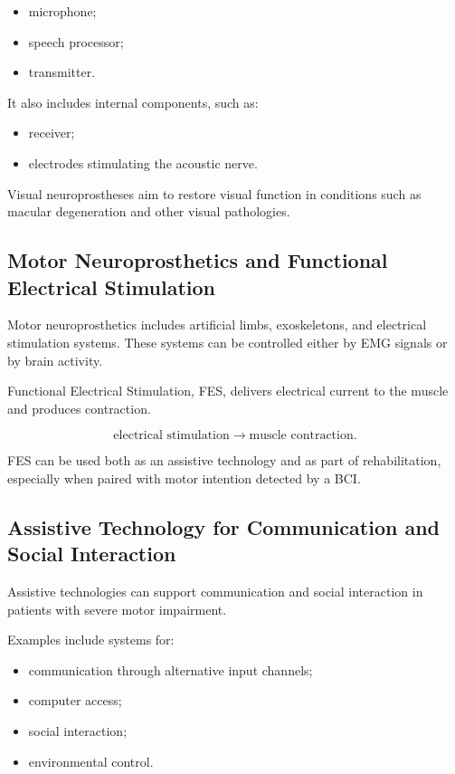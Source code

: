 \begin{itemize}[noitemsep]
    \item microphone;
    \item speech processor;
    \item transmitter.
\end{itemize}

It also includes internal components, such as:

\begin{itemize}[noitemsep]
    \item receiver;
    \item electrodes stimulating the acoustic nerve.
\end{itemize}

Visual neuroprostheses aim to restore visual function in conditions such as macular degeneration and other visual pathologies.

\subsection{Motor Neuroprosthetics and Functional Electrical Stimulation}

Motor neuroprosthetics includes artificial limbs, exoskeletons, and electrical stimulation systems. These systems can be controlled either by EMG signals or by brain activity.

Functional Electrical Stimulation, FES, delivers electrical current to the muscle and produces contraction.

\[
\text{electrical stimulation}
\rightarrow
\text{muscle contraction}.
\]

FES can be used both as an assistive technology and as part of rehabilitation, especially when paired with motor intention detected by a BCI.

\subsection{Assistive Technology for Communication and Social Interaction}

Assistive technologies can support communication and social interaction in patients with severe motor impairment.

Examples include systems for:

\begin{itemize}[noitemsep]
    \item communication through alternative input channels;
    \item computer access;
    \item social interaction;
    \item environmental control.
\end{itemize}

